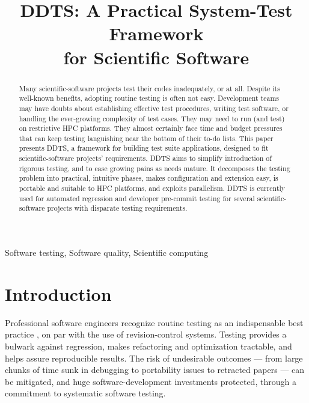 \documentclass[conference]{IEEEtran}
\begin{document}
\thispagestyle{plain} %
\pagestyle{plain}     %
\title{DDTS: A Practical System-Test Framework\\for Scientific Software}
\author{
\and
{}
}
\maketitle
\begin{abstract}
Many scientific-software projects test their codes inadequately, or at all. Despite its well-known benefits, adopting routine testing is often not easy. Development teams may have doubts about establishing effective test procedures, writing test software, or handling the ever-growing complexity of test cases. They may need to run (and test) on restrictive HPC platforms. They almost certainly face time and budget pressures that can keep testing languishing near the bottom of their to-do lists. This paper presents DDTS, a framework for building test suite applications, designed to fit scientific-software projects' requirements. DDTS aims to simplify introduction of rigorous testing, and to ease growing pains as needs mature. It decomposes the testing problem into practical, intuitive phases, makes configuration and extension easy, is portable and suitable to HPC platforms, and exploits parallelism. DDTS is currently used for automated regression and developer pre-commit testing for several scientific-software projects with disparate testing requirements.
\end{abstract}
\begin{keywords}
Software testing, Software quality, Scientific computing
\end{keywords}
\section{Introduction}
Professional software engineers recognize routine testing as an indispensable best practice \cite{prags}\cite{fowler-ci}\cite{extreme}\cite{batlab}, on par with the use of revision-control systems. Testing provides a bulwark against regression, makes refactoring and optimization tractable, and helps assure reproducible results. The risk of undesirable outcomes --- from large chunks of time sunk in debugging \cite{comp-sci-survey} to portability issues \cite{cig} to retracted papers \cite{does-not-compute} --- can be mitigated, and huge software-development investments protected, through a commitment to systematic software testing.
\end{document}
